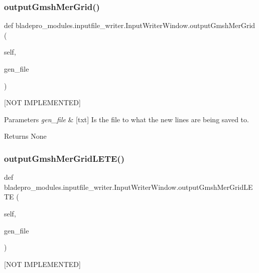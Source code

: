 \subsubsection{\texorpdfstring{output\+Gmsh\+Mer\+Grid()}{outputGmshMerGrid()}}
{\footnotesize\ttfamily def bladepro\+\_\+modules.\+inputfile\+\_\+writer.\+Input\+Writer\+Window.\+output\+Gmsh\+Mer\+Grid (\begin{DoxyParamCaption}\item[{}]{self,  }\item[{}]{gen\+\_\+file }\end{DoxyParamCaption})}



\mbox{[}N\+OT I\+M\+P\+L\+E\+M\+E\+N\+T\+ED\mbox{]} 


\begin{DoxyParams}{Parameters}
{\em gen\+\_\+file} & \mbox{[}txt\mbox{]} Is the file to what the new lines are being saved to. \\
\hline
\end{DoxyParams}
\begin{DoxyReturn}{Returns}
None 
\end{DoxyReturn}
\hypertarget{a00071_a36211b3ff2243e25921e48d71b9dcf7c}{}\label{a00071_a36211b3ff2243e25921e48d71b9dcf7c} 
\subsubsection{\texorpdfstring{output\+Gmsh\+Mer\+Grid\+L\+E\+T\+E()}{outputGmshMerGridLETE()}}
{\footnotesize\ttfamily def bladepro\+\_\+modules.\+inputfile\+\_\+writer.\+Input\+Writer\+Window.\+output\+Gmsh\+Mer\+Grid\+L\+E\+TE (\begin{DoxyParamCaption}\item[{}]{self,  }\item[{}]{gen\+\_\+file }\end{DoxyParamCaption})}



\mbox{[}N\+OT I\+M\+P\+L\+E\+M\+E\+N\+T\+ED\mbox{]} 


